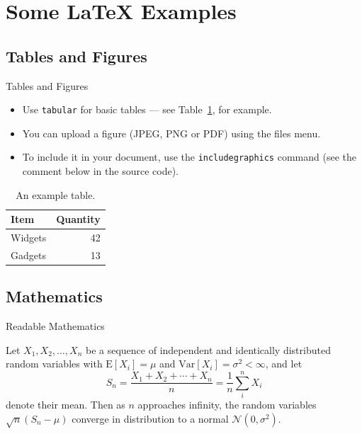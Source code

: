 \documentclass{beamer}
\begin{document}
\section{Some \LaTeX{} Examples}

\subsection{Tables and Figures}

\begin{frame}{Tables and Figures}

\begin{itemize}
\item Use \texttt{tabular} for basic tables --- see Table~\ref{tab:widgets}, for example.
\item You can upload a figure (JPEG, PNG or PDF) using the files menu. 
\item To include it in your document, %
use the \texttt{includegraphics} command (see the comment below in the source code).
\end{itemize}


\begin{table}
\centering
\begin{tabular}{l|r}
Item & Quantity \\\hline
Widgets & 42 \\
Gadgets & 13
\end{tabular}
\caption{\label{tab:widgets}An example table.}
\end{table}

\end{frame}

\subsection{Mathematics}

\begin{frame}{Readable Mathematics}

Let $X_1, X_2, \ldots, X_n$ be a sequence of independent and identically distributed random variables with $\text{E}[X_i] = \mu$ and $\text{Var}[X_i] = \sigma^2 < \infty$, and let
$$S_n = \frac{X_1 + X_2 + \cdots + X_n}{n}
      = \frac{1}{n}\sum_{i}^{n} X_i$$
denote their mean. Then as $n$ approaches infinity, the random variables $\sqrt{n}(S_n - \mu)$ converge in distribution to a normal $\mathcal{N}(0, \sigma^2)$.

\end{frame}
\end{document}
